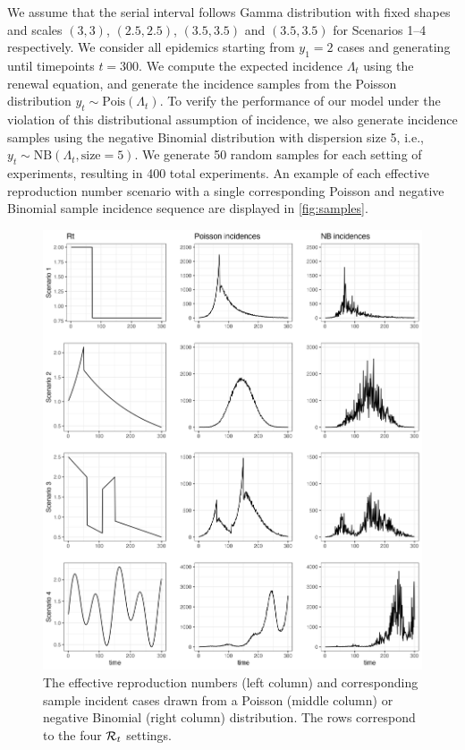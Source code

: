 We assume that the serial interval follows Gamma distribution with fixed shapes
and scales $(3,3)$, $(2.5,2.5)$, $(3.5,3.5)$ and $(3.5,3.5)$ for Scenarios 1--4
respectively. We consider all epidemics starting from $y_1=2$ cases and
generating until timepoints $t=300$. We compute the expected incidence
$\Lambda_t$ using the renewal equation, and generate the incidence samples from
the Poisson distribution $y_t\sim \textrm{Pois}(\Lambda_t)$. To verify the
performance of our model under the violation of this distributional assumption
of incidence, we also generate incidence samples using the negative Binomial
distribution with dispersion size 5, i.e., $y_t\sim \textrm{NB}(\Lambda_t,
\textrm{size}=5)$. We generate 50 random samples for each setting of
experiments, resulting in 400 total experiments. An example of each effective
reproduction number scenario with a single corresponding Poisson and negative
Binomial sample incidence sequence are displayed in \autoref{fig:samples}. 

\begin{figure}[hp!]
    \centering
    \includegraphics[width=.9\textwidth]{fig/plot_samples.png}
    \caption{The effective reproduction numbers (left column) and corresponding
    sample incident cases drawn from a  Poisson (middle column) or negative
    Binomial (right column) distribution. The rows correspond to the four
    $\mathcal{R}_t$ settings.} 
    \label{fig:samples}
\end{figure}

